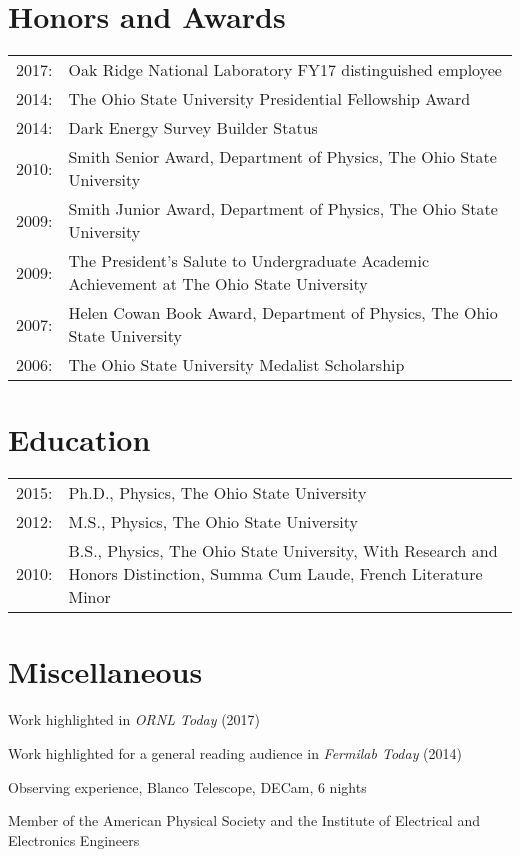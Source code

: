 \documentclass[12pt,a4paper,sans]{moderncv}	%
\begin{document}
\section{Honors and Awards}
\begin{tabularx}{\linewidth}{l X}
2017: & Oak Ridge National Laboratory FY17 distinguished employee \\
2014: & The Ohio State University Presidential Fellowship Award \\
2014: & Dark Energy Survey Builder Status \\
2010: & Smith Senior Award, Department of Physics, The Ohio State University \\
2009: & Smith Junior Award, Department of Physics, The Ohio State University  \\
2009: & The President's Salute to Undergraduate Academic Achievement at The Ohio State University \\
2007: & Helen Cowan Book Award, Department of Physics, The Ohio State University  \\
2006: & The Ohio State University Medalist Scholarship
\end{tabularx}

\section{Education}
\begin{tabularx}{\linewidth}{l X}
2015: & Ph.D., Physics, The Ohio State University \\
2012: & M.S., Physics, The Ohio State University \\
2010: & B.S., Physics, The Ohio State University, With Research and Honors Distinction, Summa Cum Laude, French Literature Minor
\end{tabularx}


\section{Miscellaneous}
\begin{achievements}
\item Work highlighted in \textit{ORNL Today} (2017)
\item Work highlighted for a general reading audience in \textit{Fermilab Today} (2014)
\item Observing experience, Blanco Telescope, DECam, 6 nights
\item Member of the American Physical Society and the Institute of Electrical and Electronics Engineers
\end{achievements}
\end{document}
